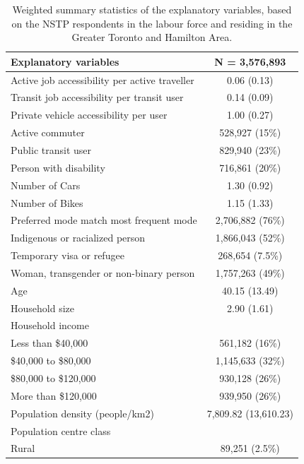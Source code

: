 \documentclass[preprint, 3p,
authoryear]{elsarticle} %
\begin{document}
\begin{table}

\caption{\label{tab:vardescriptions}\label{tab:var-description}Weighted summary statistics of the explanatory variables, based on the NSTP respondents in the labour force and residing in the Greater Toronto and Hamilton Area.}
\centering
\begin{tabular}[t]{lc}
\toprule
Explanatory variables & \textbf{N = 3,576,893}\\
\midrule
Active job accessibility per active traveller & 0.06 (0.13)\\
Transit job accessibility per transit user & 0.14 (0.09)\\
Private vehicle accessibility per user & 1.00 (0.27)\\
Active commuter & 528,927 (15\%)\\
Public transit user & 829,940 (23\%)\\
\addlinespace
Person with disability & 716,861 (20\%)\\
Number of Cars & 1.30 (0.92)\\
Number of Bikes & 1.15 (1.33)\\
Preferred mode match most frequent mode & 2,706,882 (76\%)\\
Indigenous or racialized person & 1,866,043 (52\%)\\
\addlinespace
Temporary visa or refugee & 268,654 (7.5\%)\\
Woman, transgender or non-binary person & 1,757,263 (49\%)\\
Age & 40.15 (13.49)\\
Household size & 2.90 (1.61)\\
Household income & \\
\addlinespace
\hspace{1em}Less than \$40,000 & 561,182 (16\%)\\
\hspace{1em}\$40,000 to \$80,000 & 1,145,633 (32\%)\\
\hspace{1em}\$80,000 to \$120,000 & 930,128 (26\%)\\
\hspace{1em}More than \$120,000 & 939,950 (26\%)\\
Population density (people/km2) & 7,809.82 (13,610.23)\\
\addlinespace
Population centre class & \\
\hspace{1em}Rural & 89,251 (2.5\%)\\

\end{tabular}
\end{table}
\end{document}
